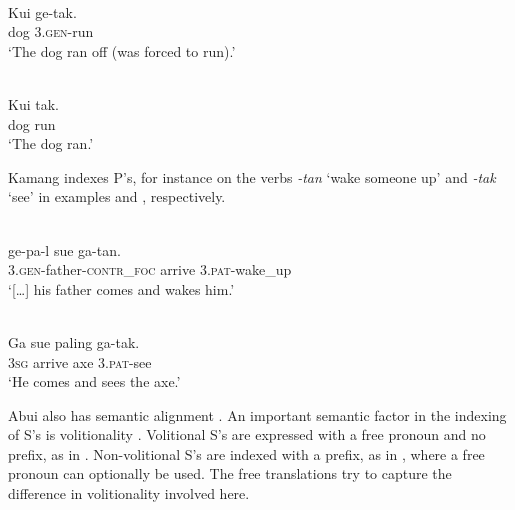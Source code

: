 \ea%
\label{bkm:Ref353455505}
 \\
\gll   Kui  ge-tak.     \\  
     dog  3.\textsc{gen}{}-run     \\
\glt  `The dog ran off (was forced to run).'
\z




 



\ea%
\label{bkm:Ref324857914}
 \\
\gll    Kui  tak.  \\  
     dog  run   \\
\glt  `The dog ran.'
\z







Kamang  indexes P's, for instance on the verbs \textit{{}-tan} `wake someone up' and \textit{{}-tak} `see' in examples  and , respectively.


\ea 
\label{ex:1236}
 \\
 \gll    [\dots]  ge-pa-l  sue  ga-tan.  \\
    [{\dots}]  3.\textsc{gen}{}-father-\textsc{contr\_foc} arrive  3.\textsc{pat}{}-wake\_up   \\
 \glt  `[{\dots}] his father comes and wakes him.'
\z








\ea%
\label{bkm:Ref383697282}
 \\
\gll    Ga  sue  paling  ga-tak. \\  
      3\textsc{sg} arrive  axe  3.\textsc{pat}{}-see  \\
\glt  `He comes and sees the axe.'
\z

 





Abui  also has semantic alignment . An important semantic factor in the indexing of S's is volitionality . Volitional S's are expressed with a free pronoun  and no prefix, as in . Non-volitional S's are indexed with a prefix, as in , where a free pronoun can optionally be used. The free translations try to capture the difference in volitionality involved here.


